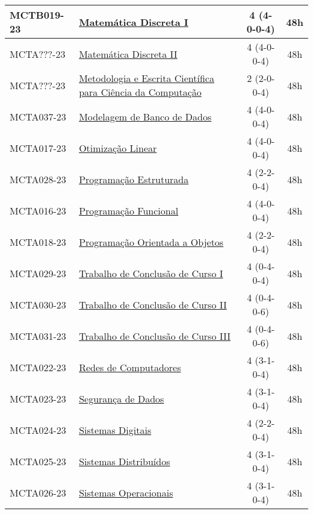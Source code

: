 \begin{table}[h!]
\begin{tabular}{|l|p{}|c|c|}
        MCTB019-23 & \hyperref[disc:mdI]{Matemática Discreta I} & 4 (4-0-0-4) & 48h \\
        \hline
        MCTA???-23 & \hyperref[disc:mdII]{Matemática Discreta II} & 4 (4-0-0-4) & 48h \\
        \hline
        MCTA???-23 & \hyperref[disc:metod]{Metodologia e Escrita Científica para Ciência da Computação} & 2 (2-0-0-4) & 48h \\
        \hline
        MCTA037-23 & \hyperref[disc:mbd]{Modelagem de Banco de Dados} & 4 (4-0-0-4) & 48h \\
        \hline
        MCTA017-23 & \hyperref[disc:ol]{Otimização Linear} & 4 (4-0-0-4) & 48h \\
        \hline
        MCTA028-23 & \hyperref[disc:pe]{Programação Estruturada} & 4 (2-2-0-4) & 48h \\
        \hline
        MCTA016-23 & \hyperref[disc:pf]{Programação Funcional} & 4 (4-0-0-4) & 48h \\
        \hline
        MCTA018-23 & \hyperref[disc:poo]{Programação Orientada a Objetos} & 4 (2-2-0-4) & 48h \\
        \hline
        MCTA029-23 & \hyperref[disc:tccI]{Trabalho de Conclusão de Curso I} & 4 (0-4-0-4) & 48h \\
        \hline
        MCTA030-23 & \hyperref[disc:tccII]{Trabalho de Conclusão de Curso II} & 4 (0-4-0-6) & 48h \\
        \hline
        MCTA031-23 & \hyperref[disc:tccIII]{Trabalho de Conclusão de Curso III} & 4 (0-4-0-6) & 48h \\
        \hline
        MCTA022-23 & \hyperref[disc:redes]{Redes de Computadores} & 4 (3-1-0-4) & 48h \\
        \hline
        MCTA023-23 & \hyperref[disc:seg]{Segurança de Dados} & 4 (3-1-0-4) & 48h \\
        \hline
        MCTA024-23 & \hyperref[disc:sist_dig]{Sistemas Digitais} & 4 (2-2-0-4) & 48h \\
        \hline
        MCTA025-23 & \hyperref[disc:sist_distr]{Sistemas Distribuídos} & 4 (3-1-0-4) & 48h \\
        \hline
        MCTA026-23 & \hyperref[disc:so]{Sistemas Operacionais} & 4 (3-1-0-4) & 48h\\
        \hline
    \end{tabular}
\end{table}

